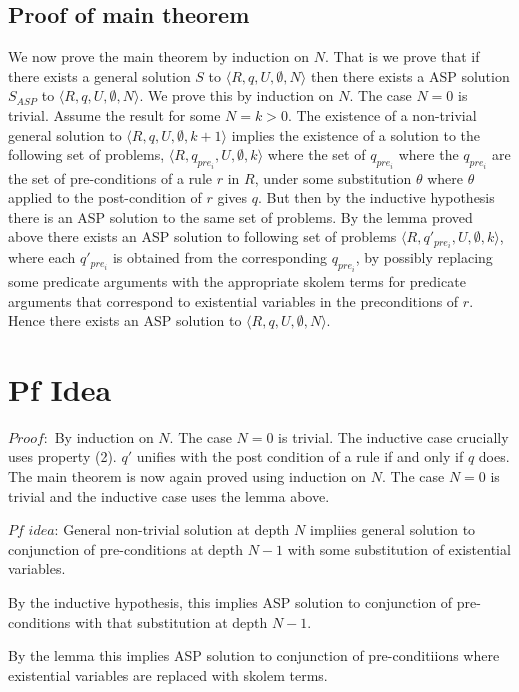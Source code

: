 \subsection{Proof of main theorem}
We now prove the main theorem by induction on $N$. That is we prove that if
there exists a general solution $S$ to $\langle R,q,U,\emptyset,N\rangle$ then there exists
a ASP solution $S_{ASP}$ to $\langle R,q,U,\emptyset,N\rangle$. We prove this by induction
on $N$. The case $N=0$ is trivial. Assume the result for some $N=k>0$. The
existence of a non-trivial general solution to $\langle R,q,U,\emptyset,k+1\rangle$ implies
the existence of a solution to the following set of problems,
$\langle R,q_{pre_{i}},U,\emptyset,k\rangle$ where the set of $q_{pre_{i}}$ where the
$q_{pre_{i}}$ are the set of pre-conditions of a rule $r$ in $R$, under some
substitution $\theta$ where $\theta$ applied to the post-condition of $r$
gives $q$. But then by the inductive hypothesis there is an ASP solution to
the same set of problems. By the lemma proved above there exists an ASP
solution to following set of problems $\langle R,q'_{pre_{i}},U,\emptyset,k\rangle$, where
each $q'_{pre_{i}}$ is obtained from the corresponding $q_{pre_{i}}$, by
possibly replacing some predicate arguments with the appropriate skolem terms
for predicate arguments that correspond to existential variables in the
preconditions of $r$. Hence there exists an ASP solution to
$\langle R,q,U,\emptyset,N\rangle$.

\section{Pf Idea}

$Proof:$ By induction on $N$. The case $N=0$ is trivial. The inductive case crucially uses property (2). $q'$ unifies with the post condition of a rule if and only if $q$ does.
The main theorem is now again proved using induction on $N$. The case $N=0$ is trivial and the inductive case uses the lemma above.

$Pf$ $idea$: General non-trivial solution at depth $N$ impliies general solution to conjunction of pre-conditions at depth $N-1$ with some substitution of existential variables.

By the inductive hypothesis, this implies ASP solution to conjunction of pre-conditions with that substitution at depth $N-1$.

By the lemma this implies ASP solution to conjunction of pre-conditiions where existential variables are replaced with skolem terms. 


